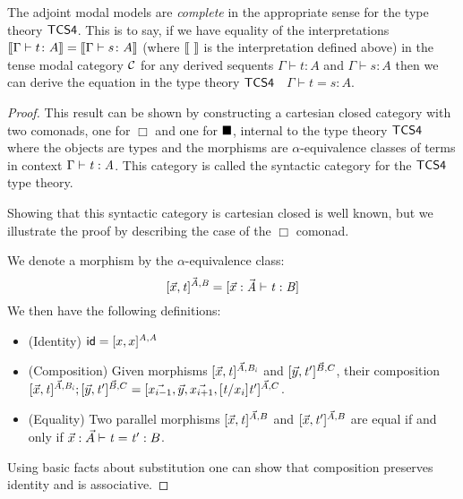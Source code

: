 \begin{theorem*}
\label{thm:tcs4-completeness}
The adjoint modal models are \textit{complete} in the appropriate
sense for the type theory $\sf{TCS4}$. This is to say, if we have
equality of the interpretations $\sem{\Gamma \vdash t \colon A} =
\sem{\Gamma \vdash s \colon A}$ (where \mbox{$\sem{\ } $} is the
interpretation defined above) in the tense modal category $\cal C$ for
any derived sequents $\Gamma \vdash t \colon A$ and $\Gamma \vdash s
\colon A$ then we can derive the equation in the type theory
$\sf{TCS4}$ $\;$ $\Gamma \vdash t = s \colon A$.
\end{theorem*}

\begin{proof}
  This result can be shown by constructing a cartesian closed category
  with two comonads, one for $\Box$ and one for $\blacksquare$, internal to the type theory
  $\sf{TCS4}$ where the objects are types and the morphisms are
  $\alpha$-equivalence classes of terms in context $\Gamma  \vdash  \mathit{t}  :  \mathit{A}$.
  This category is called the syntactic category for the $\sf{TCS4}$
  type theory.

  Showing that this syntactic category is cartesian closed is well
  known, but we illustrate the proof by describing the case of the
  $\Box$ comonad.

  We denote a morphism by the $\alpha$-equivalence class:
  \[
  [\vec{x},\mathit{t} ]^{\vec{\mathit{A}},\mathit{B}} = [ \vec{x}:\vec{\mathit{A}} \vdash \mathit{t} : \mathit{B} ]
  \]
  We then have the following definitions:
  \begin{itemize}
  \item (Identity) $\mathsf{id} = [x,x]^{\mathit{A},\mathit{A}}$
  \item (Composition) Given morphisms $[\vec{x},\mathit{t} ]^{\vec{A},\mathit{B_{\mathit{i}}}}$ and
    $[\vec{y},\mathit{t'} ]^{\vec{B},C}$, their composition
    $[\vec{x},\mathit{t} ]^{\vec{A},\mathit{B_{\mathit{i}}}};[\vec{y},\mathit{t'} ]^{\vec{B},C} =
    [\vec{x_{i-1}},\vec{y},\vec{x_{i+1}},[ \mathit{t} / x_i ] \mathit{t'} ]^{\vec{A},C}$.
  \item (Equality) Two parallel morphisms $[\vec{x},\mathit{t} ]^{\vec{A},B}$ and $[\vec{x},\mathit{t'} ]^{\vec{A},B}$ are
    equal if and only if
    $\vec{x} : \vec{A} \vdash \mathit{t} = \mathit{t'} : B$.
  \end{itemize}
  Using basic facts about substitution one can show that composition
  preserves identity and is associative.


\end{proof}
